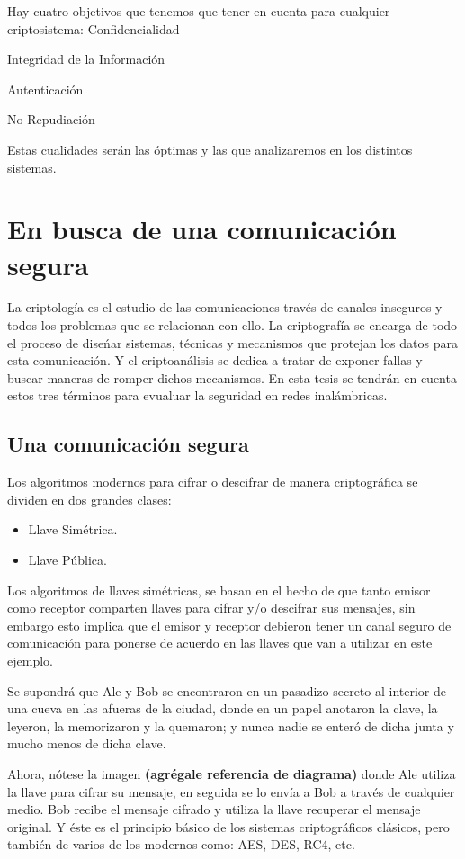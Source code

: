 Hay cuatro objetivos que tenemos que tener en cuenta para cualquier criptosistema:
Confidencialidad

Integridad de la Información

Autenticación

No-Repudiación

Estas cualidades serán las óptimas y las que analizaremos en los distintos sistemas.

\section{En busca de una comunicación segura}
La criptología es el estudio de las comunicaciones través de canales inseguros y todos los problemas que se relacionan con ello. La criptografía se encarga de todo el proceso de dise\'nar sistemas, técnicas y mecanismos que protejan los datos para esta comunicación. Y el criptoanálisis se dedica a tratar de exponer fallas y buscar maneras de romper dichos mecanismos. En esta tesis se tendrán en cuenta estos tres términos para evualuar la seguridad en redes inalámbricas.

\subsection{Una comunicación segura}
 
Los algoritmos modernos para cifrar o descifrar de manera criptográfica se dividen en dos grandes clases:
\begin{itemize}
\item  Llave Simétrica.
\item  Llave Pública.
\end{itemize}
Los algoritmos de llaves simétricas, se basan en el hecho de que tanto emisor como receptor comparten llaves para cifrar y/o descifrar sus mensajes, sin embargo esto implica que el emisor y receptor debieron tener un canal seguro de comunicación para ponerse de acuerdo en las llaves que van a utilizar en este ejemplo.  

Se supondrá que Ale y Bob se encontraron en un pasadizo secreto al interior de una cueva en las afueras de la ciudad, donde en un papel anotaron la clave, la leyeron, la memorizaron y la quemaron; y nunca nadie se enteró de dicha junta y mucho menos de dicha clave. 

Ahora, nótese la imagen {\bf(agrégale referencia de diagrama)} donde Ale utiliza la llave para cifrar su mensaje, en seguida se lo envía a Bob a través de cualquier medio. Bob recibe el mensaje cifrado y utiliza la llave recuperar el mensaje original. Y éste es el principio básico de los sistemas criptográficos clásicos, pero también de varios de los modernos como: AES, DES, RC4, etc.

